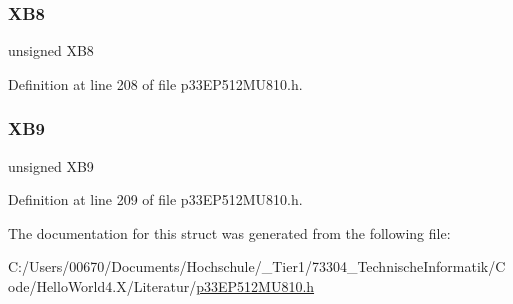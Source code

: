 \subsubsection{\texorpdfstring{X\+B8}{XB8}}
{\footnotesize\ttfamily unsigned X\+B8}



Definition at line 208 of file p33\+E\+P512\+M\+U810.\+h.

\mbox{\label{structtag_x_b_r_e_v_b_i_t_s_ab49c34475ac53d237bf37f2ee50039d4}} 
\subsubsection{\texorpdfstring{X\+B9}{XB9}}
{\footnotesize\ttfamily unsigned X\+B9}



Definition at line 209 of file p33\+E\+P512\+M\+U810.\+h.



The documentation for this struct was generated from the following file\+:\begin{DoxyCompactItemize}
\item 
C\+:/\+Users/00670/\+Documents/\+Hochschule/\+\_\+\+Tier1/73304\+\_\+\+Technische\+Informatik/\+Code/\+Hello\+World4.\+X/\+Literatur/\hyperlink{p33_e_p512_m_u810_8h}{p33\+E\+P512\+M\+U810.\+h}\end{DoxyCompactItemize}
